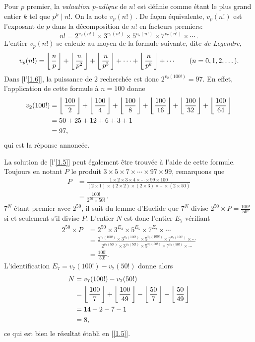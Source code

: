 Pour $p$ premier, la \emph{valuation p-adique} de $n!$ est définie comme étant le plus grand entier $k$ tel que $p^k \mid n!$. 
On la note $v_p(n!)$\,. De façon équivalente, $v_p(n!)$ est l'exposant de $p$ dans la décomposition de $n!$ en %
facteurs premiers: 
%
\begin{equation}
  n! = 2^{v_2(n!)} \times 3^{v_3(n!)} \times 5^{v_5(n!)} \times 7^{v_7(n!)} \times \cdots\,.
\end{equation}
%
L'entier $v_p(n!)$ se calcule au moyen de la formule suivante, dite \emph{de Legendre},
%
\begin{equation}
  v_p(n!) = \floor[\bigg]{\frac{n}{p}} 
  + \floor[\bigg]{\frac{n}{p^2}}
  + \floor[\bigg]{\frac{n}{p^3}}
  + \cdots 
  + \floor[\bigg]{\frac{n}{p^k}}
  + \cdots \qquad (\naturals{n}).
\end{equation}
%
Dans [l'\ref{1.6}], la puissance de $2$ recherchée est donc $2^{v_2(100!)}=97$. En effet, l'application de cette formule à %
$n=100$ donne %
%
\begin{align}
  v_2(100!)&= \floor[\bigg]{\frac{100}{2}}
  + \floor[\bigg]{\frac{100}{4}}
  + \floor[\bigg]{\frac{100}{8}} 
  + \floor[\bigg]{\frac{100}{16}} 
  + \floor[\bigg]{\frac{100}{32}}
  + \floor[\bigg]{\frac{100}{64}}\\
  &= 50 + 25 + 12 + 6 + 3 + 1 \\
  &= 97, 
\end{align}
%
qui est la réponse annoncée.

La solution de [l'\ref{1.5}] peut également être trouvée à l'aide de cette formule. Toujours en notant $P$ le produit %
$3 \times 5 \times 7 \times \cdots \times 97 \times 99$, remarquons que
%
\begin{align}
P &= \frac{
    1 \times 2 \times 3 \times 4 \times \cdots \times 99 \times 100%
    }{(2 \times 1) \times (2\times 2) \times (2 \times 3) \times \cdots \times (2 \times 50)%
  } \\
&=\frac{100!}{2^{50} \times 50!}\, .
\end{align}
%
$7^N$ étant premier avec $2^{50}$, il suit du lemme d'Euclide que $7^N$ divise $2^{50} \times P = \frac{100!}{50!}$ %
si et seulement s'il divise $P$. L'entier $N$ est donc l'entier $E_7$ vérifiant 
%
\begin{align}
  2^{50} \times P &= 2^{50} \times 3^{E_3} \times 5^{E_5} \times 7^{E_7} \times \cdots \\
  &= \frac{
    2^{v_2(100!)} \times 3^{v_3(100!)} \times 5^{v_5(100!)} \times 7^{v_7(100!)} \times \cdots
    }{
      2^{v_2(50!)} \times 3^{v_3(50!)} \times 5^{v_5(50!)} \times 7^{v_7(50!)} \times \cdots
    }\\
  &=\frac{100!}{50!}.
\end{align}
%
L'identification $E_7 = v_7(100!) - v_7(50!)$ donne alors 
%
\begin{align}
  N&= v_7(100!) - v_7(50!) \\
  &= \floor[\bigg]{\frac{100}{7}}
  + \floor[\bigg]{\frac{100}{49}}
  - \floor[\bigg]{\frac{50}{7}} 
  - \floor[\bigg]{\frac{50}{49}} \\
  &= 14 + 2 - 7 - 1 \\
  &= 8, 
\end{align}
ce qui est bien le résultat établi en [\ref{1.5}].
%
